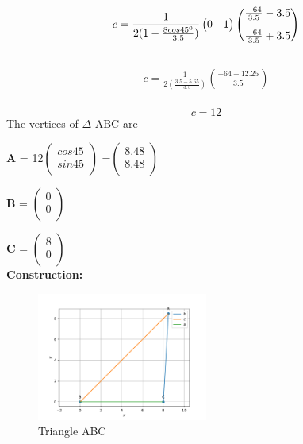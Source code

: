 \documentclass{article}
\begin{document}
\begin{equation}
         c
         =
         \frac{1}{2(1-\frac{8cos45^0}{3.5})}
	  \begin{pmatrix}
	   0 & 1
	  \end{pmatrix} 
     \begin{pmatrix}
	  \frac{-64}{3.5}-3.5 \vspace{3mm} \\
	   \frac{-64}{3.5}+3.5 
     \end{pmatrix}
   \end{equation}\\
\begin{align}
	 c
	 =
	 \frac{1}{2\left(\frac{3.5-5.65}{3.5}\right)}
	 \left(\frac{-64+12.25}{3.5}\right) 
     \end{align}\\
     \begin{equation}
	 c = 12
      \end{equation}	     
  The vertices of $\Delta$ ABC are \\ \vspace{3mm}
     \raggedright \textbf{A} = 12$\begin{pmatrix}
                 cos 45 \\ 
                 sin 45 \\
              \end{pmatrix}$
              =$\begin{pmatrix}
                 8.48 \\
                 8.48 \\
                 \end{pmatrix}$
                 \vspace{5mm}
              \\ \raggedright  \textbf{B} = $\begin{pmatrix}
                 0\\
                 0\\
              \end{pmatrix}$
              \vspace{5mm}
             \\ \raggedright  \textbf{C} = $\begin{pmatrix}
                  8\\
                  0\\
              \end{pmatrix}$
              \\
	      \vspace{5mm}
\pagebreak	      
\textbf{Construction:}\\
\begin{figure}[h]
 \begin{center}
	 \includegraphics[width=0.5\textwidth]{figs/triangle.pdf}
 \end{center}
 \caption{Triangle ABC}
 \label{fig:Fig1}
\end{figure}	
\end{document}
